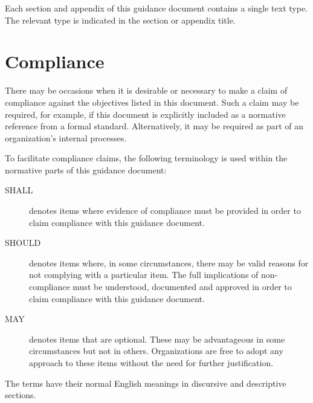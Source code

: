 Each section and appendix of this guidance document contains a single text type. The relevant type is indicated in the section or appendix title.

\section{Compliance}
There may be occasions when it is desirable or necessary to make a claim of compliance against the objectives listed in this document. Such a claim may be required, for example, if this document is explicitly included as a normative reference from a formal standard. Alternatively, it may be required as part of an organization's internal processes.

To facilitate compliance claims, the following terminology is used within the normative parts of this guidance document:
\begin{description}
	\item[SHALL] denotes items where evidence of compliance must be provided in order to claim compliance with this guidance document.
	\item[SHOULD] denotes items where, in some circumstances, there may be valid reasons for not complying with a particular item. The full implications of non-compliance must be understood, documented and approved in order to claim compliance with this guidance document.
	\item[MAY] denotes items that are optional. These may be advantageous in some circumstances but not in others. Organizations are free to adopt any approach to these items without the need for further justification.
\end{description}

The terms have their normal English meanings in discursive and descriptive sections.
